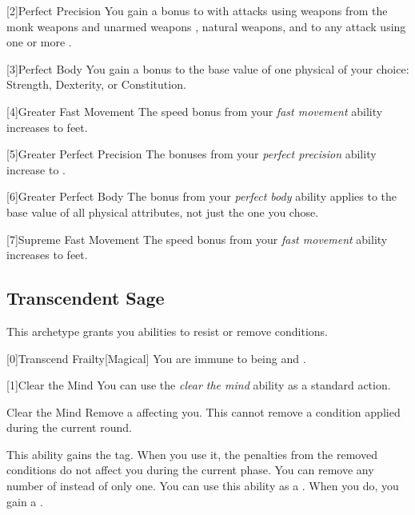         [2]{Perfect Precision} You gain a  bonus to  with attacks using weapons from the monk weapons and unarmed weapons , natural weapons, and to any attack using one or more .

        [3]{Perfect Body} You gain a  bonus to the base value of one physical  of your choice: Strength, Dexterity, or Constitution.

        [4]{Greater Fast Movement} The speed bonus from your \textit{fast movement} ability increases to  feet.

        [5]{Greater Perfect Precision} The bonuses from your \textit{perfect precision} ability increase to .

        [6]{Greater Perfect Body} The bonus from your \textit{perfect body} ability applies to the base value of all physical attributes, not just the one you chose.

        [7]{Supreme Fast Movement} The speed bonus from your \textit{fast movement} ability increases to  feet.

    \newpage
    \subsection{Transcendent Sage}
        This archetype grants you abilities to resist or remove conditions.

        [0]{Transcend Frailty}[Magical]
        You are immune to being  and .

        [1]{Clear the Mind} You can use the \textit{clear the mind} ability as a standard action.
        \begin{freeability}{Clear the Mind}
            Remove a  affecting you.
            This cannot remove a condition applied during the current round.

            \rankline
             This ability gains the  tag.
            When you use it, the penalties from the removed conditions do not affect you during the current phase.
             You can remove any number of  instead of only one.
             You can use this ability as a .
            When you do, you gain a .
        \end{freeability}

